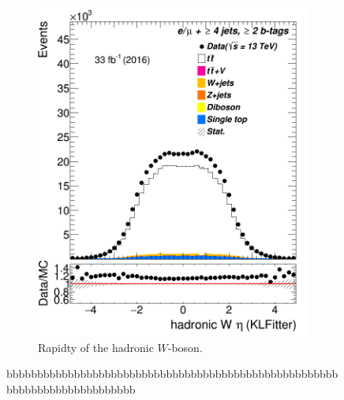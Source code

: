\begin{figure}
\begin{subfigure}{0.35\textwidth}
		\includegraphics[width=\linewidth]{ControlPlots_emujets_2016_4incl_2incl/klf_Whad_eta_emujets_2016.png}
		\caption{Rapidty of the hadronic $W$-boson.} \label{fig:34}
	\end{subfigure}
	\caption{bbbbbbbbbbbbbbbbbbbbbbbbbbbbbbbbbbbbbbbbbbbbbbbbbbbbbbbbbbbbbbbbbbbbbbbbbbb}
\end{figure}	








